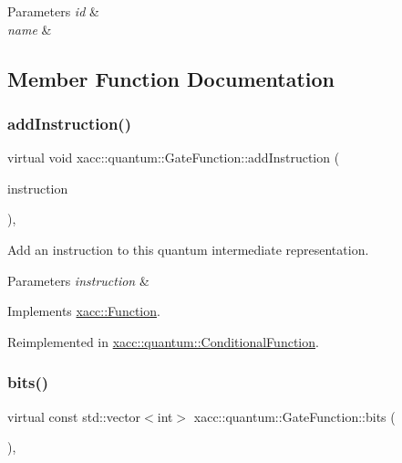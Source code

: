 \begin{DoxyParams}{Parameters}
{\em id} & \\
\hline
{\em name} & \\
\hline
\end{DoxyParams}


\subsection{Member Function Documentation}
\mbox{\label{a01272_a892fb69a10f0a7cb5abdab4cca61b80a}} 
\subsubsection{\texorpdfstring{add\+Instruction()}{addInstruction()}}
{\footnotesize\ttfamily virtual void xacc\+::quantum\+::\+Gate\+Function\+::add\+Instruction (\begin{DoxyParamCaption}\item[{Inst\+Ptr}]{instruction }\end{DoxyParamCaption})\hspace{0.3cm}{\ttfamily [inline]}, {\ttfamily [virtual]}}

Add an instruction to this quantum intermediate representation.


\begin{DoxyParams}{Parameters}
{\em instruction} & \\
\hline
\end{DoxyParams}


Implements \hyperlink{a02456_aa8c9ec2d08be75c69399d4254b0216f5}{xacc\+::\+Function}.



Reimplemented in \hyperlink{a01304_a6aedad20f96390880efdc0a476b3273f}{xacc\+::quantum\+::\+Conditional\+Function}.

\mbox{\label{a01272_aba03de68b76a9e120705c3c389c714a1}} 
\subsubsection{\texorpdfstring{bits()}{bits()}}
{\footnotesize\ttfamily virtual const std\+::vector$<$int$>$ xacc\+::quantum\+::\+Gate\+Function\+::bits (\begin{DoxyParamCaption}{ }\end{DoxyParamCaption})\hspace{0.3cm}{\ttfamily [inline]}, {\ttfamily [virtual]}}

